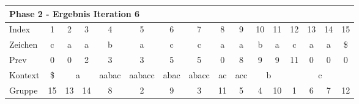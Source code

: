 \begin{table}[H]
\caption[Konstruktion des Suffix Arrays f{\"u}r das Wort caabaccaabacaa: Phase 2, Iteration 5]{Konstruktion des Suffix Arrays f{\"u}r das Wort caabaccaabacaa: Phase 2, Iteration 5. Betrachteter Index: 5, enthaltener Wert: 2, Vorg{\"a}ngerelement: 1, \prevpointer-Kette: 0. Element 1 wird in SA aufgenommen.}
\label{table_complex_example_2_5} 
\end{table}

\begin{table}[H]
\centering
\begin{adjustbox}{max width=\textwidth}
\centering
\begin{tabular}{lccccccccccccccc}
\multicolumn{16}{l}{Phase 2 - Ergebnis Iteration 6}                                                                                                                                                                                                                                                                                        \\ \hline
\multicolumn{1}{l|}{Index}   & 1                       & 2  & 3                       & 4                          & 5                           & 6                                              & 7                          & 8                       & 9                        & 10 & 11                      & 12  & 13  & 14  & 15  \\
\multicolumn{1}{l|}{Zeichen} & c                       & a  & a                       & b                          & a                           & c                                              & c                          & a                       & a                        & b  & a                       & c   & a   & a   & \$  \\
\multicolumn{1}{l|}{Prev}    & 0                       & 0  & 2                       & 3                          & 3                           & 5                                              & 5                          & 0                       & 8                        & 9  & 9                       & 11  & 0   & 0   & 0   \\ \hline
\multicolumn{1}{l|}{Kontext} & \multicolumn{1}{c|}{\$} & \multicolumn{2}{c|}{a}       & \multicolumn{1}{c|}{aabac} & \multicolumn{1}{c|}{aabacc} & \multicolumn{1}{c|}{abac}                      & \multicolumn{1}{c|}{abacc} & \multicolumn{1}{c|}{ac} & \multicolumn{1}{c|}{acc} & \multicolumn{2}{c|}{b}       & \multicolumn{4}{c}{c} \\
\multicolumn{1}{l|}{Gruppe}  & \multicolumn{1}{c|}{15} & 13 & \multicolumn{1}{c|}{14} & \multicolumn{1}{c|}{8}     & \multicolumn{1}{c|}{2}      & \multicolumn{1}{c|}{9}                         & \multicolumn{1}{c|}{3}     & \multicolumn{1}{c|}{11} & \multicolumn{1}{c|}{5}   & 4  & \multicolumn{1}{c|}{10} & 1   & 6   & 7   & 12  \\

\end{tabular}
\end{adjustbox}
\end{table}
